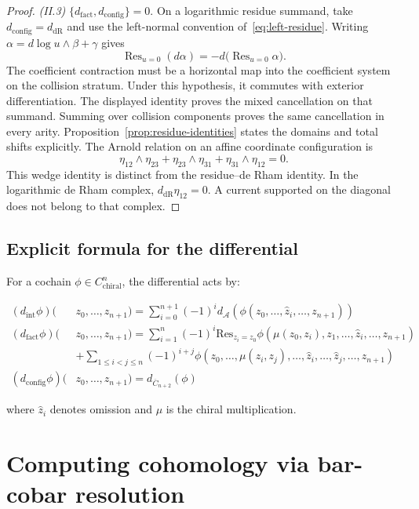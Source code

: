 \begin{proof}
\emph{(II.3)} $\{d_{\text{fact}},d_{\text{config}}\}=0$.
On a logarithmic residue summand, take $d_{\text{config}}=d_{\mathrm{dR}}$
and use the left-normal convention of~\eqref{eq:left-residue}.
Writing $\alpha=d\log u\wedge\beta+\gamma$ gives
\[
\operatorname{Res}_{u=0}(d\alpha)
=-d\bigl(\operatorname{Res}_{u=0}\alpha\bigr).
\]
The coefficient contraction must be a horizontal map into the coefficient system on the collision stratum.
Under this hypothesis, it commutes with exterior differentiation.
The displayed identity proves the mixed cancellation on that summand.
Summing over collision components proves the same cancellation in every arity.
Proposition~\ref{prop:residue-identities} states the domains and total shifts explicitly.
The Arnold relation on an affine coordinate configuration is
\begin{equation}\label{eq:arnold-three-point}
\eta_{12}\wedge\eta_{23}+\eta_{23}\wedge\eta_{31}
+\eta_{31}\wedge\eta_{12}=0.
\end{equation}
This wedge identity is distinct from the residue--de Rham identity.
In the logarithmic de Rham complex, $d_{\mathrm{dR}}\eta_{12}=0$.
A current supported on the diagonal does not belong to that complex.

\end{proof}

\subsection{Explicit formula for the differential}

For a cochain $\phi \in C^n_{\text{chiral}}$, the differential acts by:

\begin{align}
(d_{\text{int}}\phi)(&z_0,\ldots,z_{n+1}) = \sum_{i=0}^{n+1} (-1)^i d_{\mathcal{A}}(\phi(z_0,\ldots,\hat{z}_i,\ldots,z_{n+1})) \\
(d_{\text{fact}}\phi)(&z_0,\ldots,z_{n+1}) = \sum_{i=1}^n (-1)^i \text{Res}_{z_i = z_0} \phi(\mu(z_0,z_i),z_1,\ldots,\hat{z}_i,\ldots,z_{n+1}) \\
&+ \sum_{1 \leq i < j \leq n} (-1)^{i+j} \phi(z_0,\ldots,\mu(z_i,z_j),\ldots,\hat{z}_i,\ldots,\hat{z}_j,\ldots,z_{n+1}) \\
(d_{\text{config}}\phi)(&z_0,\ldots,z_{n+1}) = d_{\overline{C}_{n+2}}(\phi)
\end{align}

where $\hat{z}_i$ denotes omission and $\mu$ is the chiral multiplication.

\section{Computing cohomology via bar-cobar resolution}

